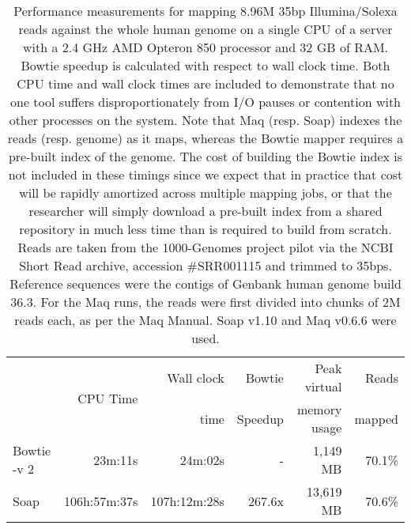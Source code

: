\documentclass[letterpaper]{article}
\begin{document}
\begin{table}[tp]
\scriptsize
\begin{tabular}{lrrrrr}
\toprule
 & \multirow{2}{*}{CPU Time} & Wall clock & Bowtie  & Peak virtual & Reads  \\
 &                            & time       & Speedup & memory usage & mapped \\[3pt]
\toprule
Bowtie -v 2 & 23m:11s & 24m:02s & - & 1,149 MB & 70.1\%\\\midrule
Soap & 106h:57m:37s & 107h:12m:28s & 267.6x & 13,619 MB & 70.6\%\\
\bottomrule
\end{tabular}
\caption{Performance measurements for mapping 8.96M 35bp Illumina/Solexa reads against the whole human genome on a single CPU of a server with a 2.4 GHz AMD Opteron 850 processor and 32 GB of RAM. Bowtie speedup is calculated with respect to wall clock time. Both CPU time and wall clock times are included to demonstrate that no one tool suffers disproportionately from I/O pauses or contention with other processes on the system. Note that Maq (resp. Soap) indexes the reads (resp. genome) as it maps, whereas the Bowtie mapper requires a pre-built index of the genome.  The cost of building the Bowtie index is not included in these timings since we expect that in practice that cost will be rapidly amortized across multiple mapping jobs, or that the researcher will simply download a pre-built index from a shared repository in much less time than is required to build from scratch. Reads are taken from the 1000-Genomes project pilot via the NCBI Short Read archive, accession \#SRR001115 and trimmed to 35bps. Reference sequences were the contigs of Genbank human genome build 36.3. For the Maq runs, the reads were first divided into chunks of 2M reads each, as per the Maq Manual. Soap v1.10 and Maq v0.6.6 were used. }
\end{table}
\end{document}
